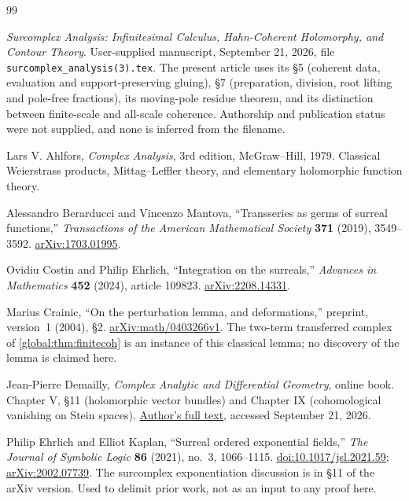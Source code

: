 \documentclass[11pt,letterpaper]{article}
\theoremstyle{definition}
\theoremstyle{remark}
\numberwithin{equation}{section}
\begin{document}
\begin{thebibliography}{99}

\emph{Surcomplex Analysis: Infinitesimal Calculus, Hahn-Coherent Holomorphy, and Contour Theory}.
User-supplied manuscript, September 21, 2026, file \texttt{surcomplex\_analysis(3).tex}.
The present article uses its \S5 (coherent data, evaluation and support-preserving gluing), \S7 (preparation, division, root lifting and pole-free fractions), its moving-pole residue theorem, and its distinction between finite-scale and all-scale coherence. Authorship and publication status were not supplied, and none is inferred from the filename.

Lars V. Ahlfors, \emph{Complex Analysis}, 3rd edition, McGraw--Hill, 1979.
Classical Weierstrass products, Mittag--Leffler theory, and elementary holomorphic function theory.

Alessandro Berarducci and Vincenzo Mantova,
``Transseries as germs of surreal functions,''
\emph{Transactions of the American Mathematical Society} \textbf{371} (2019), 3549--3592.
\href{https://arxiv.org/abs/1703.01995}{arXiv:1703.01995}.

Ovidiu Costin and Philip Ehrlich,
``Integration on the surreals,''
\emph{Advances in Mathematics} \textbf{452} (2024), article 109823.
\href{https://arxiv.org/abs/2208.14331}{arXiv:2208.14331}.

Marius Crainic, ``On the perturbation lemma, and deformations,''
preprint, version~1 (2004), \S2.
\href{https://arxiv.org/abs/math/0403266v1}{arXiv:math/0403266v1}.
The two-term transferred complex of \cref{global:thm:finitecoh} is an instance of this classical lemma; no discovery of the lemma is claimed here.

Jean-Pierre Demailly, \emph{Complex Analytic and Differential Geometry}, online book. Chapter V, \S11 (holomorphic vector bundles) and Chapter IX (cohomological vanishing on Stein spaces).
\href{https://www-fourier.univ-grenoble-alpes.fr/~demailly/manuscripts/agbook.pdf}{Author's full text}, accessed September 21, 2026.

Philip Ehrlich and Elliot Kaplan,
``Surreal ordered exponential fields,''
\emph{The Journal of Symbolic Logic} \textbf{86} (2021), no.~3, 1066--1115.
\href{https://doi.org/10.1017/jsl.2021.59}{doi:10.1017/jsl.2021.59};
\href{https://arxiv.org/abs/2002.07739}{arXiv:2002.07739}.
The surcomplex exponentiation discussion is in \S11 of the arXiv version. Used to delimit prior work, not as an input to any proof here.


\end{thebibliography}
\end{document}
